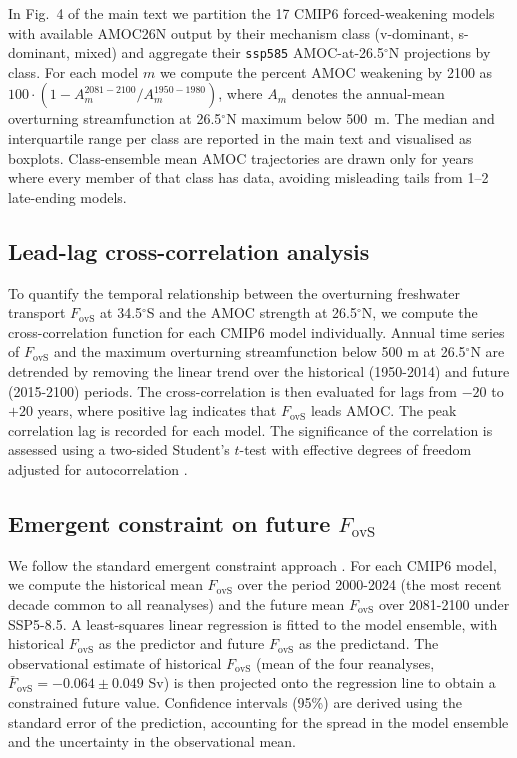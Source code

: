 \documentclass[11pt,a4paper]{article}
\begin{document}
In Fig.~4 of the main text we partition the 17 CMIP6 forced-weakening models with available AMOC26N output by their mechanism class (v-dominant, s-dominant, mixed) and aggregate their \texttt{ssp585} AMOC-at-26.5$^\circ$N projections by class. For each model $m$ we compute the percent AMOC weakening by 2100 as $100\cdot (1 - A_m^{2081-2100} / A_m^{1950-1980})$, where $A_m$ denotes the annual-mean overturning streamfunction at 26.5$^\circ$N maximum below 500~m. The median and interquartile range per class are reported in the main text and visualised as boxplots. Class-ensemble mean AMOC trajectories are drawn only for years where every member of that class has data, avoiding misleading tails from 1--2 late-ending models.

\subsection*{Lead-lag cross-correlation analysis}

To quantify the temporal relationship between the overturning freshwater transport \(F_{\mathrm{ovS}}\) at 34.5$^\circ$S and the AMOC strength at 26.5$^\circ$N, we compute the cross-correlation function for each CMIP6 model individually. Annual time series of \(F_{\mathrm{ovS}}\) and the maximum overturning streamfunction below 500 m at 26.5$^\circ$N are detrended by removing the linear trend over the historical (1950-2014) and future (2015-2100) periods. The cross-correlation is then evaluated for lags from \(-20\) to \(+20\) years, where positive lag indicates that \(F_{\mathrm{ovS}}\) leads AMOC. The peak correlation lag is recorded for each model. The significance of the correlation is assessed using a two-sided Student's \(t\)-test with effective degrees of freedom adjusted for autocorrelation \citep{Santer2000}.

\subsection*{Emergent constraint on future \(F_{\mathrm{ovS}}\)}

We follow the standard emergent constraint approach \citep{Portmann2026, ArumiPlanas2024}. For each CMIP6 model, we compute the historical mean \(F_{\mathrm{ovS}}\) over the period 2000-2024 (the most recent decade common to all reanalyses) and the future mean \(F_{\mathrm{ovS}}\) over 2081-2100 under SSP5-8.5. A least-squares linear regression is fitted to the model ensemble, with historical \(F_{\mathrm{ovS}}\) as the predictor and future \(F_{\mathrm{ovS}}\) as the predictand. The observational estimate of historical \(F_{\mathrm{ovS}}\) (mean of the four reanalyses, \(\bar{F}_{\mathrm{ovS}} = -0.064\pm0.049\) Sv) is then projected onto the regression line to obtain a constrained future value. Confidence intervals (95\%) are derived using the standard error of the prediction, accounting for the spread in the model ensemble and the uncertainty in the observational mean.
\end{document}
